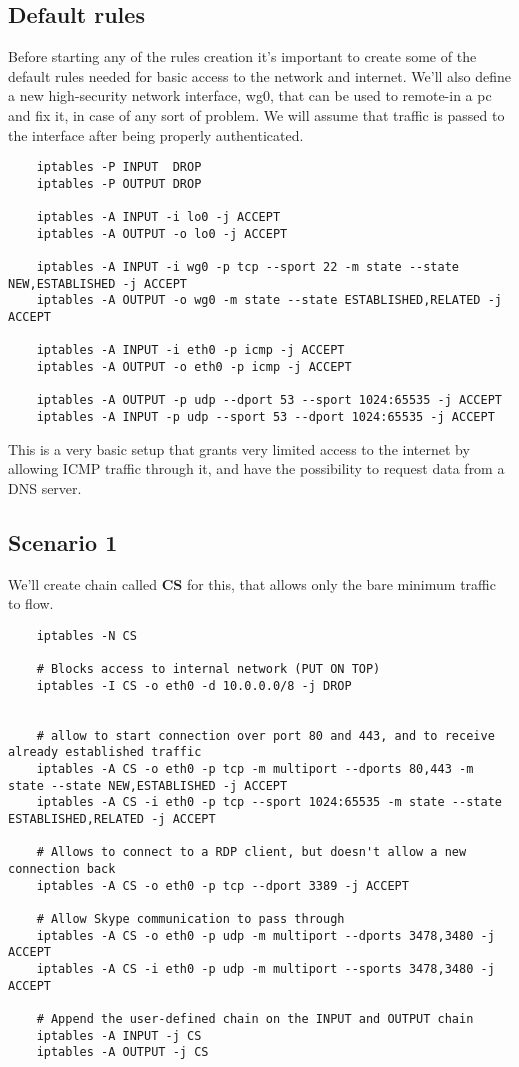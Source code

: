 \documentclass{article}
\begin{document}
\subsection*{Default rules}
Before starting any of the rules creation it's important to create some of the default rules needed for basic access to the network and internet. We'll also define a new high-security network interface, wg0, that can be used to remote-in a pc and fix it, in case of any sort of problem. We will assume that traffic is passed to the interface after being properly authenticated.

\begin{lstlisting}
    iptables -P INPUT  DROP
    iptables -P OUTPUT DROP
    
    iptables -A INPUT -i lo0 -j ACCEPT
    iptables -A OUTPUT -o lo0 -j ACCEPT

    iptables -A INPUT -i wg0 -p tcp --sport 22 -m state --state NEW,ESTABLISHED -j ACCEPT
    iptables -A OUTPUT -o wg0 -m state --state ESTABLISHED,RELATED -j ACCEPT

    iptables -A INPUT -i eth0 -p icmp -j ACCEPT
    iptables -A OUTPUT -o eth0 -p icmp -j ACCEPT
    
    iptables -A OUTPUT -p udp --dport 53 --sport 1024:65535 -j ACCEPT
    iptables -A INPUT -p udp --sport 53 --dport 1024:65535 -j ACCEPT
\end{lstlisting}
 This is a very basic setup that grants very limited access to the internet by allowing ICMP traffic through it, and have the possibility to request data from a DNS server.
 
\subsection*{Scenario 1}
We'll create chain called \textbf{CS} for this, that allows only the bare minimum traffic to flow.

\begin{lstlisting}
    iptables -N CS

    # Blocks access to internal network (PUT ON TOP)
    iptables -I CS -o eth0 -d 10.0.0.0/8 -j DROP
    
    
    # allow to start connection over port 80 and 443, and to receive already established traffic
    iptables -A CS -o eth0 -p tcp -m multiport --dports 80,443 -m state --state NEW,ESTABLISHED -j ACCEPT
    iptables -A CS -i eth0 -p tcp --sport 1024:65535 -m state --state ESTABLISHED,RELATED -j ACCEPT
    
    # Allows to connect to a RDP client, but doesn't allow a new connection back 
    iptables -A CS -o eth0 -p tcp --dport 3389 -j ACCEPT

    # Allow Skype communication to pass through
    iptables -A CS -o eth0 -p udp -m multiport --dports 3478,3480 -j ACCEPT
    iptables -A CS -i eth0 -p udp -m multiport --sports 3478,3480 -j ACCEPT

    # Append the user-defined chain on the INPUT and OUTPUT chain
    iptables -A INPUT -j CS
    iptables -A OUTPUT -j CS
\end{lstlisting}
\end{document}
